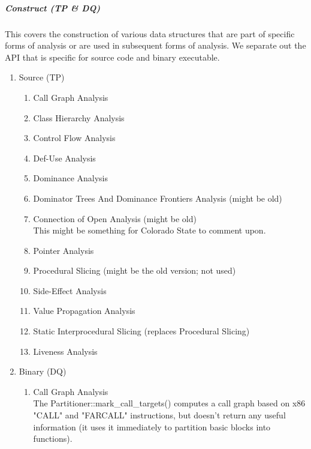 \subparagraph{Construct (TP \& DQ)}
   This covers the construction of various data structures that are part of
specific forms of analysis or are used in subsequent forms of analysis.
We separate out the API that is specific for source code and binary executable.
\begin{enumerate}
   \item Source (TP) \\
   \begin{enumerate}
      \item Call Graph Analysis
      \item Class Hierarchy Analysis
      \item Control Flow Analysis
      \item Def-Use Analysis
      \item Dominance Analysis
      \item Dominator Trees And Dominance Frontiers Analysis (might be old)

      \item Connection of Open Analysis (might be old) \\
      This might be something for Colorado State to comment upon.

      \item Pointer Analysis \\

      \item Procedural Slicing (might be the old version; not used) 

      \item Side-Effect Analysis

      \item Value Propagation Analysis

      \item Static Interprocedural Slicing (replaces Procedural Slicing)
      \item Liveness Analysis
   \end{enumerate}

   \item Binary (DQ) \\
   \begin{enumerate}
      \item Call Graph Analysis \\
      The Partitioner::mark\_call\_targets() computes a call graph
      based on x86 "CALL" and "FARCALL" instructions, but doesn't
      return any useful information (it uses it immediately to
      partition basic blocks into functions).


\end{enumerate}
\end{enumerate}
